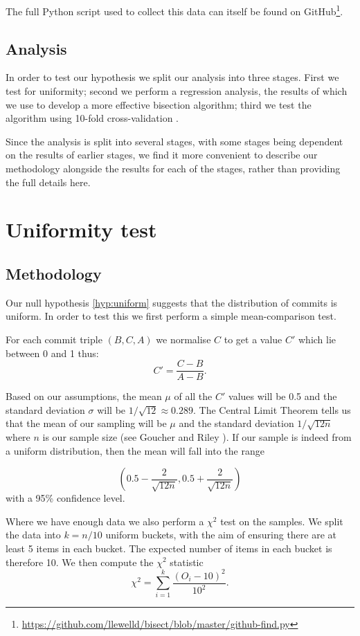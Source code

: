 \documentclass[10pt,journal,compsoc]{IEEEtran}
\begin{document}
The full Python script used to collect this data can itself be found on GitHub\footnote{\url{https://github.com/llewelld/bisect/blob/master/github-find.py}}.

\subsection{Analysis}

In order to test our hypothesis we split our analysis into three stages. First we test for uniformity; second we perform a regression analysis, the results of which we use to develop a more effective bisection algorithm; third we test the algorithm using 10-fold cross-validation \cite{}.

Since the analysis is split into several stages, with some stages being dependent on the results of earlier stages, we find it more convenient to describe our methodology alongside the results for each of the stages, rather than providing the full details here.

\section{Uniformity test}
\label{section-uniformity}

\subsection{Methodology}

Our null hypothesis \ref{hyp:uniform} suggests that the distribution of commits is uniform. In order to test this we first perform a simple mean-comparison test.

For each commit triple $(B, C, A)$ we normalise $C$ to get a value $C'$ which lie between 0 and 1 thus:
$$
C' = \frac{C - B}{A - B} .
$$

Based on our assumptions, the mean $\mu$ of all the $C'$ values will be 0.5 and the standard deviation $\sigma$ will be $1 / \sqrt{12} \approx 0.289$. The Central Limit Theorem tells us that the mean of our sampling will be $\mu$ and the standard deviation $1 / \sqrt{12 n}$ where $n$ is our sample size (see Goucher and Riley \cite{goucher2009}). If our sample is indeed from a uniform distribution, then the mean will fall into the range

$$
\left( 0.5 - \frac{2}{\sqrt{12 n}}, 0.5 + \frac{2}{\sqrt{12 n}} \right)
$$
with a 95\% confidence level.

Where we have enough data we also perform a $\chi^2$ test on the samples. We split the data into $k = n / 10$ uniform buckets, with the aim of ensuring there are at least 5 items in each bucket. The expected number of items in each bucket is therefore 10. We then compute the $\chi^2$ statistic \cite{knuth2014}
$$
\chi^2 = \sum_{i = 1}^k \frac{(O_i - 10)^2}{10^2} .
$$
\end{document}
